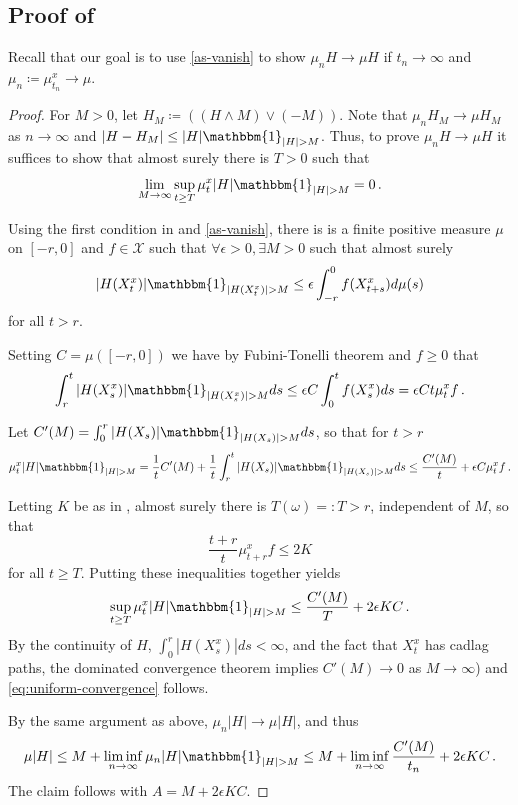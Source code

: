 \documentclass[final]{amsart}
\numberwithin{thm}{section}
\numberwithin{equation}{section}
\newcommand{\Id}{\mathbbm{1}}
\newcommand{\X}{\mathcal{X}}
\begin{document}
\subsection{Proof of } Recall that our goal is to use \ref{as-vanish} to show $\mu_nH \to \mu H$ if $t_n \to \infty$ and $\mu_n \coloneqq \mu_{t_n}^x \to \mu$.

\begin{proof}
For $M > 0$, let $H_M \coloneqq ((H \wedge M) \vee (-M))$. Note that $\mu_n H_M \to \mu H_M$ as $n \to \infty$ and $|H - H_M| \leq |H|\Id_{|H| > M}$.
Thus, to prove $\mu_nH \to \mu H$ it suffices to show that almost surely there is $T > 0$ such that \begin{equation}\label{eq:uniform-convergence}
    \lim_{M \to \infty} \sup_{t \geq T} \mu_t^x |H|\Id_{|H| > M} = 0 \,.
\end{equation}

Using the first condition in  and \ref{as-vanish}, there is is a finite positive measure $\mu$ on $[-r,0]$ and $f \in \X$ such that 
 $\forall \epsilon > 0, \exists M > 0$ such that almost surely $$|H(X_t^x)|\Id_{|H(X_t^x)|>M} \leq \epsilon \int_{-r}^0  f(X^x_{t+s})d \mu(s)$$ 
for all $t > r$. 

 Setting $C =  \mu([-r,0])$ we have by Fubini-Tonelli theorem and $f \geq 0$ that 
\begin{equation*}
        \int_r^t |H(X_s^x)|\Id_{|H(X_s^x)|>M}ds \leq \epsilon C \int_0^{t}  f(X_s^x)ds = \epsilon Ct \mu_{t}^x  f\,.
\end{equation*}

Let $C'(M) = \int_0^r |H(X_s)|\Id_{|H(X_s)|>M}ds$, so that for $t > r$ $$\mu_t^x |H|\Id_{|H| > M} = \frac{1}{t}C'(M) + \frac{1}{t}\int_r^t |H(X_s)|\Id_{|H(X_s)|>M}ds \leq \frac{C'(M)}{t} + \epsilon C \mu_{t}^x f \,.$$

Letting $K$ be as in , almost surely there is  $T(\omega) =: T > r$, independent of $M$,  so that $$\frac{t+r}{t}\mu_{t+r}^x f \leq 2K$$ for all $t \geq T$. Putting these inequalities together yields 
\begin{equation} \label{eq:depse}
  \sup_{t \geq T} \mu_t^x |H|\Id_{|H| > M} \leq \frac{C'(M)}{T} + 2\epsilon KC \,.  
\end{equation}
By the continuity of $H$, $\int_0^r |H(X_s^x)|ds < \infty$, 
 and the fact that $X_t^x$ has cadlag paths, the dominated convergence theorem implies 
 $C'(M) \to 0$ as  $M \to \infty$) and \eqref{eq:uniform-convergence} follows.

By the same argument as above, $\mu_n |H| \to \mu |H|$, and thus $$\mu |H| \leq M + \liminf_{n \to \infty} \mu_n |H|\Id_{|H| > M} \leq M + \liminf_{n \to \infty} \frac{C'(M)}{t_n} + 2\epsilon KC \,.$$ The claim follows with $A = M + 2\epsilon KC$.
\end{proof}
\end{document}
